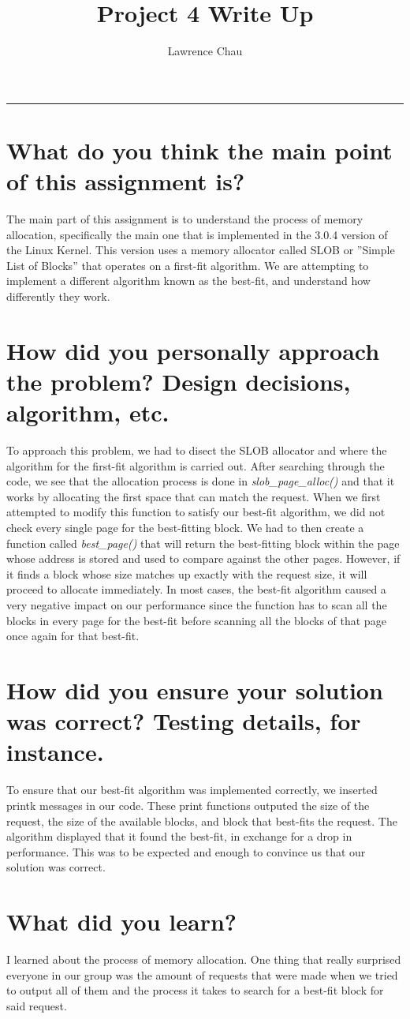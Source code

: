 \documentclass[letterpaper,10pt,notitlepage,fleqn]{article}
\title{Project 4 Write Up}
\author{Lawrence Chau}
\begin{document}
\maketitle
\hrule

\section*{What do you think the main point of this assignment is?}
    The main part of this assignment is to understand the process of memory allocation, specifically the main one that is implemented in the 3.0.4 version of the Linux Kernel. This version uses a memory allocator called SLOB or ''Simple List of Blocks'' that operates on a first-fit algorithm. We are attempting to implement a different algorithm known as the best-fit, and understand how differently they work. 
\section*{How did you personally approach the problem? Design decisions, algorithm, etc.}
   To approach this problem, we had to disect the SLOB allocator and where the algorithm for the first-fit algorithm is carried out. After searching through the code, we see that the allocation process is done in \textit{slob\_page\_alloc()} and that it works by allocating the first space that can match the request. When we first attempted to modify this function to satisfy our best-fit algorithm, we did not check every single page for the best-fitting block. We had to then create a
   function called \textit{best\_page()} that will return the best-fitting block within the page whose address is stored and used to compare against the other pages. However, if it finds a block whose size matches up exactly with the request size, it will proceed to allocate immediately. In most cases, the best-fit algorithm caused a very negative impact on our performance since the function has to scan all the blocks in every page for the best-fit before scanning all the blocks of that page once again for that best-fit. 
\section*{How did you ensure your solution was correct? Testing details, for instance.}
    To ensure that our best-fit algorithm was implemented correctly, we inserted printk messages in our code. These print functions outputed the size of the request, the size of the available blocks, and block that best-fits the request. The algorithm displayed that it found the best-fit, in exchange for a drop in performance. This was to be expected and enough to convince us that our solution was correct. 
\section*{What did you learn?}
    I learned about the process of memory allocation. One thing that really surprised everyone in our group was the amount of requests that were made when we tried to output all of them and the process it takes to search for a best-fit block for said request.
   
\end{document}
